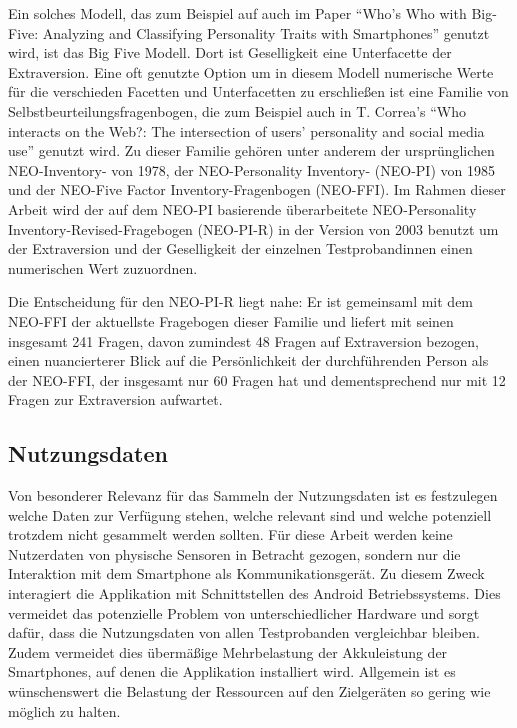 Ein solches Modell, das zum Beispiel auf auch im Paper "`Who’s Who with Big-Five: Analyzing and Classifying Personality Traits with Smartphones"'\cite{chittaranjan2011s} genutzt wird, ist das Big Five Modell.
Dort ist Geselligkeit eine Unterfacette der Extraversion.
Eine oft genutzte Option um in diesem Modell numerische Werte für die verschieden Facetten und Unterfacetten zu erschließen ist eine Familie von Selbstbeurteilungsfragenbogen,
die zum Beispiel auch in T. Correa's "`Who interacts on the Web?: The intersection of users’ personality and social media use"' \cite{butt2008personality} genutzt wird.
Zu dieser Familie gehören unter anderem der ursprünglichen NEO-Inventory-  von 1978, der NEO-Personality Inventory- (NEO-PI) von 1985 und der NEO-Five Factor Inventory-Fragenbogen (NEO-FFI).
Im Rahmen dieser Arbeit wird der auf dem NEO-PI basierende überarbeitete NEO-Personality Inventory-Revised-Fragebogen (NEO-PI-R) in der Version von 2003 benutzt\cite{neopir2003}
um der Extraversion und der Geselligkeit der einzelnen Testprobandinnen einen numerischen Wert zuzuordnen.

Die Entscheidung für den NEO-PI-R liegt nahe: 
Er ist gemeinsaml mit dem NEO-FFI der aktuellste Fragebogen dieser Familie und liefert mit seinen insgesamt 241 Fragen, davon zumindest 48 Fragen auf Extraversion bezogen,
einen nuancierterer Blick auf die Persönlichkeit der durchführenden Person als der NEO-FFI, der insgesamt nur 60 Fragen hat und dementsprechend nur mit 12 Fragen zur Extraversion aufwartet.



\subsection{Nutzungsdaten}

Von besonderer Relevanz für das Sammeln der Nutzungsdaten ist es festzulegen welche Daten zur Verfügung stehen, welche relevant sind und welche potenziell trotzdem nicht gesammelt werden sollten.
Für diese Arbeit werden keine Nutzerdaten von physische Sensoren in Betracht gezogen, sondern nur die Interaktion mit dem Smartphone als Kommunikationsgerät.
Zu diesem Zweck interagiert die Applikation mit Schnittstellen des Android Betriebssystems.
Dies vermeidet das potenzielle Problem von unterschiedlicher Hardware und sorgt dafür, dass die Nutzungsdaten von allen Testprobanden vergleichbar bleiben.
Zudem vermeidet dies übermäßige Mehrbelastung der Akkuleistung der Smartphones, auf denen die Applikation installiert wird.
Allgemein ist es wünschenswert die Belastung der Ressourcen auf den Zielgeräten so gering wie möglich zu halten.
\par


